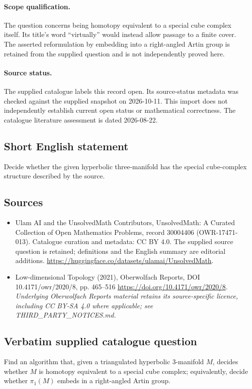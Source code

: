 \documentclass[11pt]{article}
\begin{document}
\paragraph{Scope qualification.}
The question concerns being homotopy equivalent to a special cube complex itself. Its title's word ``virtually'' would instead allow passage to a finite cover. The asserted reformulation by embedding into a right-angled Artin group is retained from the supplied question and is not independently proved here.
\paragraph{Source status.}
The supplied catalogue labels this record open. Its source-status metadata was checked against the supplied snapshot on 2026-10-11. This import does not independently establish current open status or mathematical correctness. The catalogue literature assessment is dated 2026-08-22.
\subsection{Short English statement}
Decide whether the given hyperbolic three-manifold has the special cube-complex structure described by the source.
\subsection{Sources}
\begin{itemize}
\item[S1] Ulam AI and the UnsolvedMath Contributors, UnsolvedMath: A Curated Collection of Open Mathematics Problems, record 30004406 (OWR-17471-013). Catalogue curation and metadata: CC BY 4.0. The supplied source question is retained; definitions and the English summary are editorial additions.
\url{https://huggingface.co/datasets/ulamai/UnsolvedMath}.
\item[S2] Low-dimensional Topology (2021), Oberwolfach Reports, DOI 10.4171/owr/2020/8, pp. 465--516
\url{https://doi.org/10.4171/owr/2020/8}.
\textit{Underlying Oberwolfach Reports material retains its source-specific licence, including CC BY-SA 4.0 where applicable; see THIRD\_PARTY\_NOTICES.md.}
\end{itemize}
\subsection{Verbatim supplied catalogue question}
Find an algorithm that, given a triangulated hyperbolic $3$-manifold $M$, decides whether $M$ is homotopy equivalent to a special cube complex; equivalently, decide whether $\pi_1(M)$ embeds in a right-angled Artin group.
\end{document}
